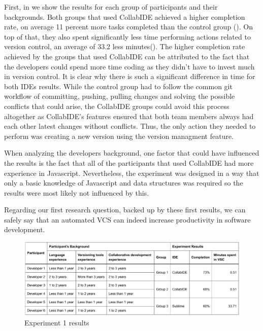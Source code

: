 First, in  we show the results for each group of participants and their backgrounds. Both groups that used CollabIDE achieved a higher completion rate, on average 11 percent more tasks completed than the control group (). On top of that, they also spent significantly less time performing actions related to version control, an average of 33.2 less minutes(). The higher completion rate achieved by the groups that used CollabIDE can be attributed to the fact that the developers could spend more time coding as they didn’t have to invest much in version control. It is clear why there is such a significant difference in time for both IDEs results. While the control group had to follow the common git workflow of committing, pushing, pulling changes and solving the possible conflicts that could arise, the CollabIDE groups could avoid this process altogether as CollabIDE’s features ensured that both team members always had each other latest changes without conflicts. Thus, the only action they needed to perform was creating a new version using the version managment feature.

When analyzing the developers background, one factor that could have influenced the results is the fact that all of the participants that used CollabIDE had more experience in Javascript. Nevertheless, the experiment was designed in a way that only a basic knowledge of Javascript and data structures was required so the results were most likely not influenced by this.

Regarding our first research question, backed up by these first results, we can safely say that an automated \ac{VCS} can indeed increase productivity in software development.

\begin{figure}[htbp]
  \centering
  \includegraphics[width=1\textwidth]{img/resultsTableCollaborative}
  \caption{Experiment 1 results}
  \label{fig:resultsTableCollaborative}
\end{figure}

